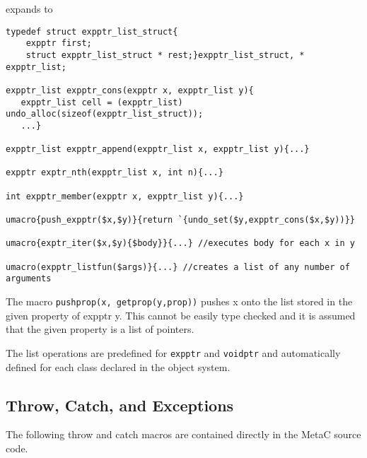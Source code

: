 \documentclass{article}
\begin{document}
expands to

\begin{verbatim}
typedef struct expptr_list_struct{
    expptr first;
    struct expptr_list_struct * rest;}expptr_list_struct, * expptr_list;

expptr_list expptr_cons(expptr x, expptr_list y){
   expptr_list cell = (expptr_list) undo_alloc(sizeof(expptr_list_struct));
   ...}

expptr_list expptr_append(expptr_list x, expptr_list y){...}

expptr exptr_nth(expptr_list x, int n){...}

int expptr_member(expptr x, expptr_list y){...}

umacro{push_expptr($x,$y)}{return `{undo_set($y,expptr_cons($x,$y))}}

umacro{exptr_iter($x,$y){$body}}{...} //executes body for each x in y

umacro(expptr_listfun($args)}{...} //creates a list of any number of arguments
\end{verbatim}

The macro {\tt pushprop(x, getprop(y,prop))} pushes x onto the list stored in the given property of expptr y.  This cannot be easily type
checked and it is assumed that the given property is a list of pointers.

The list operations are predefined for {\tt expptr} and {\tt voidptr} and automatically defined for each class declared in the object system.


\subsection{Throw, Catch, and Exceptions}

The following throw and catch macros are contained directly in the MetaC source code.
\end{document}
